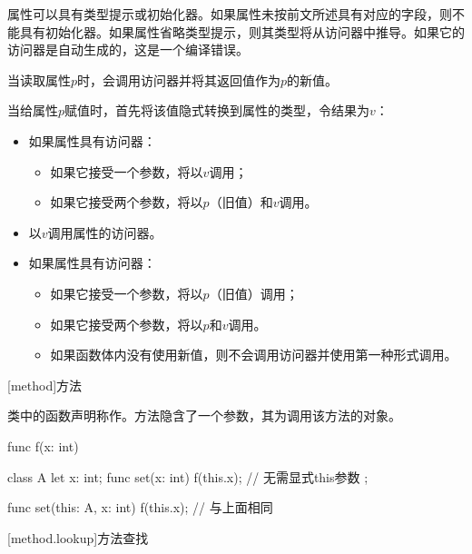 \pnum
属性可以具有类型提示或初始化器。如果属性未按前文所述具有对应的字段，则不能具有初始化器。如果属性省略类型提示，则其类型将从访问器中推导。如果它的访问器是自动生成的，这是一个编译错误。

\pnum
当读取属性$p$时，会调用访问器并将其返回值作为$p$的新值。

\pnum
当给属性$p$赋值时，首先将该值隐式转换到属性的类型，令结果为$v$：

\begin{itemize}
    \item 如果属性具有访问器：
    \begin{itemize}
        \item 如果它接受一个参数，将以$v$调用；
        \item 如果它接受两个参数，将以$p$（旧值）和$v$调用。
    \end{itemize}
    \item 以$v$调用属性的访问器。
    \item 如果属性具有访问器：
    \begin{itemize}
        \item 如果它接受一个参数，将以$p$（旧值）调用；
        \item 如果它接受两个参数，将以$p$和$v$调用。
        \item 如果函数体内没有使用新值，则不会调用访问器并使用第一种形式调用。
    \end{itemize}
\end{itemize}

[method]{方法}

\pnum
类中的函数声明称作。方法隐含了一个参数，其为调用该方法的对象。

\enterexample
\begin{codeblock}
func f(x: int) { }

class A {
    let x: int;
    func set(x: int) {
        f(this.x); // 无需显式this参数
    }
};

func set(this: A, x: int) {
    f(this.x); // 与上面相同
}

\end{codeblock}
\exitexample

[method.lookup]{方法查找}

\pnum
